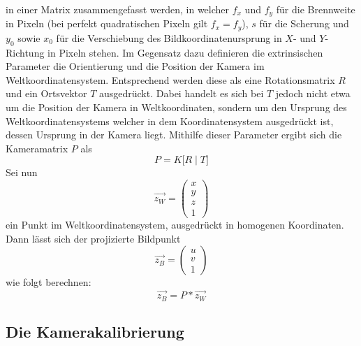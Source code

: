  in einer Matrix zusammengefasst werden, in welcher \(f_x\) und \(f_y\) für die Brennweite in Pixeln (bei perfekt quadratischen Pixeln gilt \(f_x = f_y\)), \(s\) für die Scherung und \(y_0\) sowie \(x_0\) für die Verschiebung des Bildkoordinatenursprung in \(X\)- und \(Y\)-Richtung in Pixeln stehen. 
\newline
Im Gegensatz dazu definieren die extrinsischen Parameter die Orientierung und die Position der Kamera im Weltkoordinatensystem. Entsprechend werden diese als eine Rotationsmatrix \(R\) und ein Ortsvektor \(T\) ausgedrückt. Dabei handelt es sich bei \(T\) jedoch nicht etwa um die Position der Kamera in Weltkoordinaten, sondern um den Ursprung des Weltkoordinatensystems welcher in dem Koordinatensystem ausgedrückt ist, dessen Ursprung in der Kamera liegt.
\newline
Mithilfe dieser Parameter ergibt sich die Kameramatrix \(P\) als
\begin{equation}
	P = K \big[ R \mid T \big] 
\end{equation}
Sei nun 
\begin{equation}
	\vec{z_{W}} = \left(\begin{array}{c}x\\y\\z\\1\end{array}\right)
\end{equation}
ein Punkt im Weltkoordinatensystem, ausgedrückt in homogenen Koordinaten. Dann lässt sich der projizierte Bildpunkt
\begin{equation}
	\vec{z_{B}} = \left(\begin{array}{c}u\\v\\1\end{array}\right)
\end{equation}
wie folgt berechnen:
\begin{equation}
	\vec{z_{B}} = P * \vec{z_{W}}
\end{equation}

\newpage

\subsection{Die Kamerakalibrierung}
\label{subsec:KameraKalibrierungTheorie}

